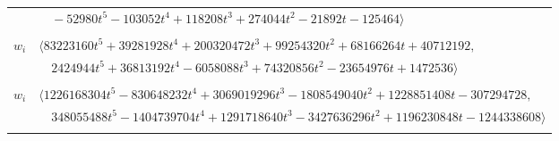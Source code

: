 \documentclass[11pt]{article}
\begin{document}
\begin{longtable}{@{}ll@{}}
 & $\quad -52980t^{5}-103052t^{4}+118208t^{3}+274044t^{2}-21892t-125464\rangle$\\
\addlinespace[2pt]
\multicolumn{2}{@{}p{0.97\textwidth}@{}}{$i=60$, $D_i=43$, $\rho_{ij}$: $0{:}1, \allowbreak 1{:}2, \allowbreak 2{:}1, \allowbreak 6{:}1, \allowbreak 8{:}1, \allowbreak 9{:}1, \allowbreak 11{:}2, \allowbreak 13{:}2, \allowbreak 14{:}2, \allowbreak 16{:}1, \allowbreak 18{:}1, \allowbreak 19{:}1, \allowbreak 20{:}1, \allowbreak 21{:}2, \allowbreak 23{:}2, \allowbreak 25{:}1, \allowbreak 31{:}1, \allowbreak 32{:}2, \allowbreak 34{:}1, \allowbreak 40{:}1, \allowbreak 62{:}1, \allowbreak 63{:}2, \allowbreak 68{:}1, \allowbreak 69{:}1, \allowbreak 72{:}1, \allowbreak 73{:}1, \allowbreak 75{:}2, \allowbreak 76{:}2, \allowbreak 79{:}2, \allowbreak 82{:}2, \allowbreak 84{:}1, \allowbreak 89{:}1, \allowbreak 95{:}2, \allowbreak 96{:}1, \allowbreak 97{:}2$}\\
$w_i$ & $\langle 83223160t^{5}+39281928t^{4}+200320472t^{3}+99254320t^{2}+68166264t+40712192,$\\
 & $\quad 2424944t^{5}+36813192t^{4}-6058088t^{3}+74320856t^{2}-23654976t+1472536\rangle$\\
\addlinespace[2pt]
\multicolumn{2}{@{}p{0.97\textwidth}@{}}{$i=61$, $D_i=43$, $\rho_{ij}$: $0{:}2, \allowbreak 1{:}1, \allowbreak 2{:}2, \allowbreak 9{:}2, \allowbreak 10{:}2, \allowbreak 11{:}1, \allowbreak 14{:}2, \allowbreak 15{:}2, \allowbreak 17{:}2, \allowbreak 18{:}2, \allowbreak 19{:}2, \allowbreak 21{:}1, \allowbreak 22{:}1, \allowbreak 25{:}1, \allowbreak 30{:}2, \allowbreak 32{:}1, \allowbreak 33{:}2, \allowbreak 38{:}2, \allowbreak 39{:}2, \allowbreak 47{:}2, \allowbreak 59{:}1, \allowbreak 62{:}2, \allowbreak 63{:}1, \allowbreak 64{:}1, \allowbreak 65{:}2, \allowbreak 67{:}2, \allowbreak 68{:}2, \allowbreak 71{:}1, \allowbreak 72{:}1, \allowbreak 74{:}2, \allowbreak 75{:}1, \allowbreak 77{:}1, \allowbreak 79{:}2, \allowbreak 82{:}1, \allowbreak 96{:}2$}\\
$w_i$ & $\langle 1226168304t^{5}-830648232t^{4}+3069019296t^{3}-1808549040t^{2}+1228851408t-307294728,$\\
 & $\quad 348055488t^{5}-1404739704t^{4}+1291718640t^{3}-3427636296t^{2}+1196230848t-1244338608\rangle$\\
\addlinespace[2pt]
\multicolumn{2}{@{}p{0.97\textwidth}@{}}{$i=62$, $D_i=1$, $\rho_{ij}$: $0{:}2, \allowbreak 11{:}1, \allowbreak 18{:}2, \allowbreak 19{:}1, \allowbreak 22{:}1, \allowbreak 24{:}1, \allowbreak 25{:}1, \allowbreak 47{:}2, \allowbreak 56{:}2, \allowbreak 59{:}2, \allowbreak 60{:}2, \allowbreak 61{:}1$}\\

\end{longtable}
\end{document}

